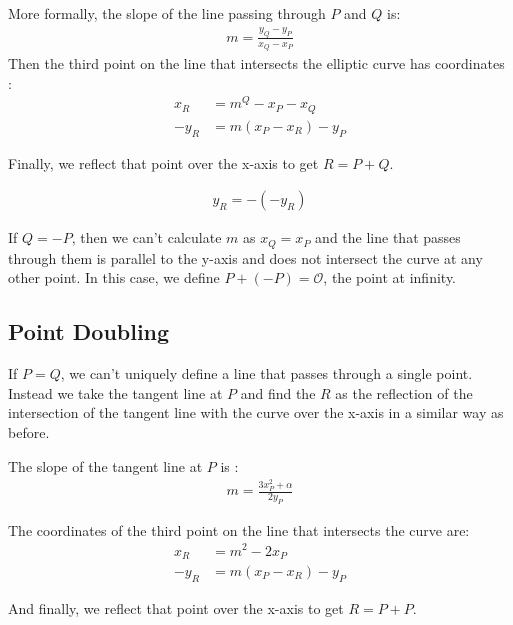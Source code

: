 More formally, the slope of the line passing through $P$ and $Q$ is:
\begin{gather}
    m = \frac{y_Q - y_P}{x_Q - x_P}
\end{gather} 
Then the third point on the line that intersects the elliptic curve has coordinates \cite{enigbe_elliptic_curve_dlp}:
\begin{align}
    x_R &= m^Q - x_P - x_Q \\
    -y_R &= m(x_P - x_R) - y_P
\end{align}

Finally, we reflect that point over the x-axis to get $R = P + Q$.

\begin{gather}
    y_R = -(-y_R)
\end{gather}

If $Q = -P$, then we can't calculate $m$ as $x_Q = x_P$ and the line that passes through them is parallel to the y-axis and does not intersect the curve at any other point. In this case, we define $P + (-P) = \mathcal{O}$, the point at infinity.


\subsection{Point Doubling}

If $P = Q$, we can't uniquely define a line that passes through a single point. Instead we take the tangent line at $P$ and find the $R$ as the reflection of the intersection of the tangent line with the curve over the x-axis in a similar way as before.


The slope of the tangent line at $P$ is \cite{enigbe_elliptic_curve_dlp}:
\begin{gather}
    m = \frac{3x_P^2 + \alpha}{2y_P}
\end{gather}

The coordinates of the third point on the line that intersects the curve are:
\begin{align}
    x_R &= m^2 - 2x_P \\
    -y_R &= m(x_P - x_R) - y_P
\end{align}

And finally, we reflect that point over the x-axis to get $R = P + P$.

